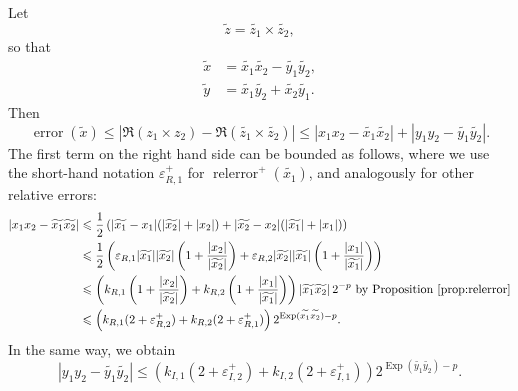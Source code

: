 \documentclass [11pt]{article}
\newcommand {\corr}[1]{{#1}}
\newcommand {\appro}[1]{\widetilde {#1}}
\DeclareMathOperator{\Exp}{\operatorname {Exp}}
\newcommand{\error}{\operatorname {error}}
\newcommand{\relerror}{\operatorname {relerror}}
\renewcommand {\epsilon}{\varepsilon}
\renewcommand {\leq}{\leqslant}
\begin{document}
Let
\[
\appro z = \appro {z_1} \times \appro {z_2},
\]
so that
\begin {align*}
\appro x & = \appro {x_1} \appro {x_2} - \appro {y_1} \appro {y_2}, \\
\appro y & = \appro {x_1} \appro {y_2} + \appro {x_2} \appro {y_1}.
\end {align*}
Then
\[
\error (\appro x)
\leq | \Re (\corr {z_1} \times \corr {z_2})
- \Re (\appro {z_1} \times \appro {z_2})|
\leq
| \corr {x_1} \corr {x_2} - \appro {x_1} \appro {x_2}|
+ | \corr {y_1} \corr {y_2} - \appro {y_1} \appro {y_2}|.
\]
The first term on the right hand side can be bounded as follows,
where we use the short-hand notation $\epsilon_{R, 1}^+$ for
$\relerror^+ (\appro {x_1})$, and analogously for other relative errors:
\begin{align*}
| \corr {x_1} \corr {x_2} - \appro {x_1} \appro {x_2}|
& \leq
\frac{1}{2} \left(
  |\appro {x_1} - \corr {x_1}| (|\appro {x_2}| + |\corr {x_2}|)
+ |\appro {x_2} - \corr {x_2}| (|\appro {x_1}| + |\corr {x_1}|)
\right)
\\
& \leq \frac {1}{2} \left(
  \epsilon_{R, 1} |\appro {x_1}| |\appro {x_2}|
  \left( 1 + \frac {|\corr {x_2}|}{|\appro {x_2}|} \right)
+ \epsilon_{R, 2} |\appro {x_2}| |\appro {x_1}|
  \left( 1 + \frac {|\corr {x_1}|}{|\appro {x_1}|} \right)
  \right)
\\
& \leq \left(
  k_{R, 1}
  \left( 1 + \frac {|\corr {x_2}|}{|\appro {x_2}|} \right)
+ k_{R, 2}
  \left( 1 + \frac {|\corr {x_1}|}{|\appro {x_1}|} \right)
  \right) |\appro {x_1} \appro {x_2}| \, 2^{-p}
  \text { by Proposition~\ref {prop:relerror}}
\\
& \leq \left(
   k_{R, 1} (2 + \epsilon_{R, 2}^+)
   + k_{R, 2} (2 + \epsilon_{R, 1}^+)
   \right) 2^{\Exp (\appro {x_1} \appro {x_2}) - p}.
\end{align*}
In the same way, we obtain
\[
| \corr {y_1} \corr {y_2} - \appro {y_1} \appro {y_2}|
\leq \left(
   k_{I, 1} (2 + \epsilon_{I, 2}^+)
   + k_{I, 2} (2 + \epsilon_{I, 1}^+)
   \right) 2^{\Exp (\appro {y_1} \appro {y_2}) - p}.
\]
\end{document}
